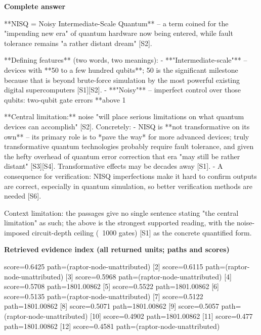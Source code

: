 \documentclass[10pt]{article}
\begin{document}
\textbf{Complete answer}
\begin{AnswerText}
**NISQ = Noisy Intermediate-Scale Quantum** -- a term coined for the "impending new era" of quantum hardware now being entered, while fault tolerance remains "a rather distant dream" [S2].

**Defining features** (two words, two meanings):
- **"Intermediate-scale"** -- devices with **50 to a few hundred qubits**; 50 is the significant milestone because that is beyond brute-force simulation by the most powerful existing digital supercomputers [S1][S2].
- **"Noisy"** -- imperfect control over those qubits: two-qubit gate errors **above 1%

**Central limitation:** noise "will place serious limitations on what quantum devices can accomplish" [S2]. Concretely:
- NISQ is **not transformative on its own** -- its primary role is to *pave the way* for more advanced devices; truly transformative quantum technologies probably require fault tolerance, and given the hefty overhead of quantum error correction that era "may still be rather distant" [S3][S4]. Transformative effects may be decades away [S1].
- A consequence for verification: NISQ imperfections make it hard to confirm outputs are correct, especially in quantum simulation, so better verification methods are needed [S6].

Context limitation: the passages give no single sentence stating "the central limitation" as such; the above is the strongest supported reading, with the noise-imposed circuit-depth ceiling (~1000 gates) [S1] as the concrete quantified form.
\end{AnswerText}

\textbf{Retrieved evidence index (all returned units; paths and scores) }
\begin{EvidenceText}
[1] score=0.6425 path=(raptor-node-unattributed)
[2] score=0.6115 path=(raptor-node-unattributed)
[3] score=0.5968 path=(raptor-node-unattributed)
[4] score=0.5708 path=1801.00862
[5] score=0.5522 path=1801.00862
[6] score=0.5135 path=(raptor-node-unattributed)
[7] score=0.5122 path=1801.00862
[8] score=0.5071 path=1801.00862
[9] score=0.5057 path=(raptor-node-unattributed)
[10] score=0.4902 path=1801.00862
[11] score=0.477 path=1801.00862
[12] score=0.4581 path=(raptor-node-unattributed)
\end{EvidenceText}
\end{document}
